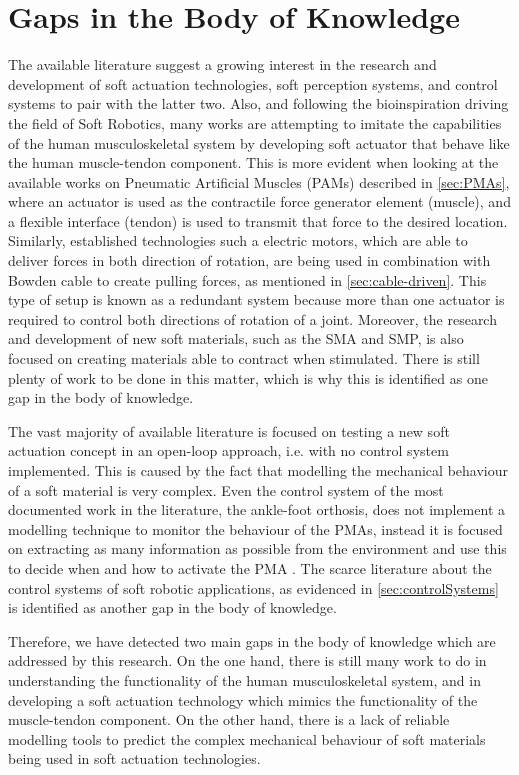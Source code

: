 \section{Gaps in the Body of Knowledge} \label{sec:gaps}

The available literature suggest a growing interest in the research and development of soft actuation technologies, soft perception systems, and control systems to pair with the latter two. Also, and following the bioinspiration driving the field of Soft Robotics, many works are attempting to imitate the capabilities of the human musculoskeletal system by developing soft actuator that behave like the human muscle-tendon component. This is more evident when looking at the available works on Pneumatic Artificial Muscles (PAMs) described in \autoref{sec:PMAs}, where an actuator is used as the contractile force generator element (muscle), and a flexible interface (tendon) is used to transmit that force to the desired location. Similarly, established technologies such a electric motors, which are able to deliver forces in both direction of rotation, are being used in combination with Bowden cable to create pulling forces, as mentioned in \autoref{sec:cable-driven}. This type of setup is known as a redundant system because more than one actuator is required to control both directions of rotation of a joint. Moreover, the research and development of new soft materials, such as the SMA and SMP, is also focused on creating materials able to contract when stimulated. There is still plenty of work to be done in this matter, which is why this is identified as one gap in the body of knowledge.

The vast majority of available literature is focused on testing a new soft actuation concept in an open-loop approach, i.e. with no control system implemented. This is caused by the fact that modelling the mechanical behaviour of a soft material is very complex. Even the control system of the most documented work in the literature, the ankle-foot orthosis, does not implement a modelling technique to monitor the behaviour of the PMAs, instead it is focused on extracting as many information as possible from the environment and use this to decide when and how to activate the PMA \cite{park2011bio}. The scarce literature about the control systems of soft robotic applications, as evidenced in \autoref{sec:controlSystems} is identified as another gap in the body of knowledge.

Therefore, we have detected two main gaps in the body of knowledge which are addressed by this research. On the one hand, there is still many work to do in understanding the functionality of the human musculoskeletal system, and in developing a soft actuation technology which mimics the functionality of the muscle-tendon component. On the other hand, there is a lack of reliable modelling tools to predict the complex mechanical behaviour of soft materials being used in soft actuation technologies. 

